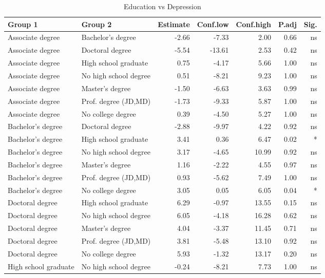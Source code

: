 \documentclass{article}
\begin{document}
\begin{table}[ht]
\centering
\caption{Education vs Depression} \label{tab:title}

\begin{tabular}{llrrrrr}
  \hline
Group 1 & Group 2 & Estimate & Conf.low & Conf.high & P.adj & Sig. \\ 
  \hline
 Associate degree & Bachelor's degree  & -2.66 & -7.33 & 2.00 & 0.66 & ns \\ 
 Associate degree & Doctoral degree  & -5.54 & -13.61 & 2.53 & 0.42 & ns \\ 
 Associate degree & High school graduate  & 0.75 & -4.17 & 5.66 & 1.00 & ns \\ 
 Associate degree & No high school degree  & 0.51 & -8.21 & 9.23 & 1.00 & ns \\ 
 Associate degree & Master's degree  & -1.50 & -6.63 & 3.63 & 0.99 & ns \\ 
 Associate degree & Prof. degree (JD,MD)  & -1.73 & -9.33 & 5.87 & 1.00 & ns \\ 
 Associate degree & No college degree  & 0.39 & -4.50 & 5.27 & 1.00 & ns \\ 
Bachelor's degree & Doctoral degree  & -2.88 & -9.97 & 4.22 & 0.92 & ns \\ 
Bachelor's degree & High school graduate  & 3.41 & 0.36 & 6.47 & 0.02 & * \\ 
Bachelor's degree & No high school degree  & 3.17 & -4.65 & 10.99 & 0.92 & ns \\ 
Bachelor's degree & Master's degree  & 1.16 & -2.22 & 4.55 & 0.97 & ns \\ 
Bachelor's degree & Prof. degree (JD,MD)  & 0.93 & -5.62 & 7.49 & 1.00 & ns \\ 
Bachelor's degree & No college degree  & 3.05 & 0.05 & 6.05 & 0.04 & * \\ 
Doctoral degree & High school graduate  & 6.29 & -0.97 & 13.55 & 0.15 & ns \\ 
Doctoral degree & No high school degree  & 6.05 & -4.18 & 16.28 & 0.62 & ns \\ 
Doctoral degree & Master's degree  & 4.04 & -3.37 & 11.45 & 0.71 & ns \\ 
Doctoral degree & Prof. degree (JD,MD)  & 3.81 & -5.48 & 13.10 & 0.92 & ns \\ 
 Doctoral degree & No college degree  & 5.93 & -1.32 & 13.17 & 0.20 & ns \\ 
 High school graduate & No high school degree  & -0.24 & -8.21 & 7.73 & 1.00 & ns \\ 

\end{tabular}
\end{table}
\end{document}
